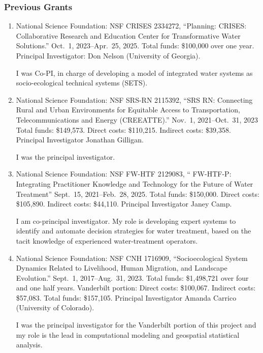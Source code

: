 \subsubsection{Previous Grants}
\begin{enumerate}
%
%
%
\item National Science Foundation: NSF CRISES 2334272,
``Planning: CRISES: Collaborative Research and Education Center for Transformative 
Water Solutions.'' 
Oct.~1, 2023--Apr.~25, 2025.
Total funds: \$100,000 over one year.
Principal Investigator: Don Nelson (University of Georgia).
\begin{credit}
	I was Co-PI, in charge of developing a model of integrated water systems as socio-ecological technical systems (SETS).
\end{credit}
%
%
\item National Science Foundation: NSF SRS-RN 2115392,
``SRS RN: Connecting Rural and Urban Environments for Equitable Access to
Transportation, Telecommunications and Energy (CREEATTE).''
Nov.~1, 2021--Oct.~31, 2023
Total funds: \$149,573. Direct costs: \$110,215. Indirect costs: \$39,358.
Principal Investigator Jonathan Gilligan.
\begin{credit}
	I was the principal investigator.
\end{credit}
%
%
\item National Science Foundation: NSF FW-HTF 2129083,
`` FW-HTF-P: Integrating Practitioner Knowledge and Technology for the Future of Water Treatment''
Sept.~15, 2021--Feb.~28, 2025.
Total funds: \$150,000. Direct costs: \$105,890. Indirect costs: \$44,110.
Principal Investigator Janey Camp.
\begin{credit}
	I am co-principal investigator. My role is developing expert systems to
	identify and automate decision strategies for water treatment, based on the
	tacit knowledge of experienced water-treatment operators.
\end{credit}
%
\item National Science Foundation: NSF CNH 1716909,
``Socioecological System Dynamics Related to Livelihood, Human Migration, and Landscape Evolution.''
Sept.~1, 2017--Aug.~31, 2023.
Total funds: \$1,498,721 over four and one half years. Vanderbilt portion: Direct costs: \$100,067. Indirect costs: \$57,083. Total funds: \$157,105.
Principal Investigator Amanda Carrico (University of Colorado).
\begin{credit}
	I was the principal investigator for the Vanderbilt portion of this project and my role is the lead in computational modeling and geospatial statistical analysis.

\end{credit}
\end{enumerate}
